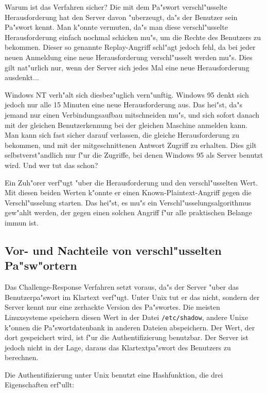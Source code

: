 \documentclass{scrartcl}\usepackage{pslatex}\typearea{12}
\newcommand{\dateistyle}{\texttt}
\begin{document}
Warum ist das Verfahren sicher? Die mit dem Pa"swort verschl"usselte
Herausforderung hat den Server davon "uberzeugt, da"s der Benutzer
sein Pa"swort kennt. Man k"onnte vermuten, da"s man diese
verschl"usselte Herausforderung einfach nochmal schicken mu"s, um die
Rechte des Benutzers zu bekommen. Dieser so genannte Replay-Angriff
schl"agt jedoch fehl, da bei jeder neuen Anmeldung eine neue
Herausforderung verschl"usselt werden mu"s. Dies gilt nat"urlich nur,
wenn der Server sich jedes Mal eine neue Herausforderung
ausdenkt$\ldots$

Windows NT verh"alt sich diesbez"uglich vern"unftig. Windows 95 denkt
sich jedoch nur alle 15 Minuten eine neue Herausforderung aus. Das
hei"st, da"s jemand nur einen Verbindungsaufbau mitschneiden mu"s, und
sich sofort danach mit der gleichen Benutzerkennung bei der gleichen
Maschine anmelden kann. Man kann sich fast sicher darauf verlassen,
die gleiche Herausforderung zu bekommen, und mit der mitgeschnittenen
Antwort Zugriff zu erhalten.  Dies gilt selbstverst"andlich nur f"ur
die Zugriffe, bei denen Windows 95 als Server benutzt wird. Und wer
tut das schon?

Ein Zuh"orer verf"ugt "uber die Herausforderung und den
verschl"usselten Wert. Mit diesen beiden Werten k"onnte er einen
Known-Plaintext-Angriff gegen die Verschl"usselung starten. Das
hei"st, es mu"s ein Verschl"usselungsalgorithmus gew"ahlt werden, der
gegen einen solchen Angriff f"ur alle praktischen Belange immun ist.

\subsection{Vor- und Nachteile von verschl"usselten Pa"sw"ortern}

Das Challenge-Response Verfahren setzt voraus, da"s der Server "uber das
Benutzerpa"swort im Klartext verf"ugt. Unter Unix tut er das nicht, sondern
der Server kennt nur eine zerhackte Version des Pa"swortes. Die meisten
Linuxsysteme speichern diesen Wert in der Datei \dateistyle{/etc/shadow},
andere Unixe k"onnen die Pa"swortdatenbank in anderen Dateien abspeichern. Der
Wert, der dort gespeichert wird, ist f"ur die Authentifizierung benutzbar. Der
Server ist jedoch nicht in der Lage, daraus das Klartextpa"swort des Benutzers
zu berechnen.

Die Authentifizierung unter Unix benutzt eine Hashfunktion, die drei
Eigenschaften erf"ullt:
\end{document}

